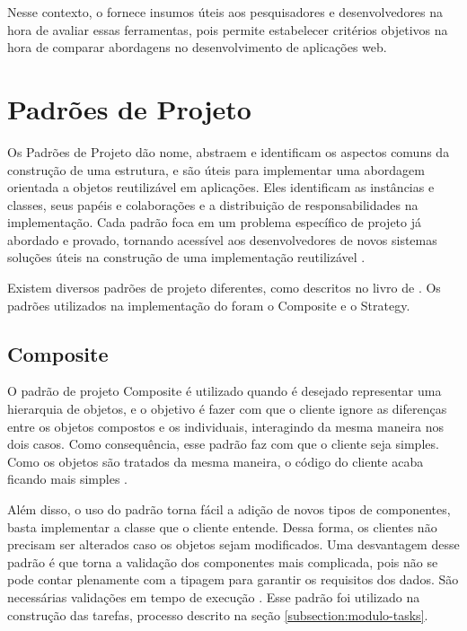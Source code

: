 \documentclass[12pt]{tcc}
\begin{document}
		Nesse contexto, o  fornece insumos úteis aos pesquisadores e desenvolvedores na hora de avaliar essas ferramentas, pois permite estabelecer critérios objetivos na hora de comparar abordagens no desenvolvimento de aplicações web.

		\section{Padrões de Projeto}
		\label{cap:padroes-de-projeto}

		Os Padrões de Projeto dão nome, abstraem e identificam os aspectos comuns da construção de uma estrutura, e são úteis para implementar uma abordagem orientada a objetos reutilizável em aplicações. Eles identificam as instâncias e classes, seus papéis e colaborações e a distribuição de responsabilidades na implementação. Cada padrão foca em um problema específico de projeto já abordado e provado, tornando acessível aos desenvolvedores de novos sistemas soluções úteis na construção de uma implementação reutilizável \citep{gamma1994design}.
		
		Existem diversos padrões de projeto diferentes, como descritos no livro de \cite{gamma1994design}. Os padrões utilizados na implementação do  foram o Composite e o Strategy.

		\subsection{Composite}
		\label{subsection:composite}

		O padrão de projeto Composite é utilizado quando é desejado representar uma hierarquia de objetos, e o objetivo é fazer com que o cliente ignore as diferenças entre os objetos compostos e os individuais, interagindo da mesma maneira nos dois casos. Como consequência, esse padrão faz com que o cliente seja simples. Como os objetos são tratados da mesma maneira, o código do cliente acaba ficando mais simples \citep[Capítulo 4]{gamma1994design}.
		
		Além disso, o uso do padrão torna fácil a adição de novos tipos de componentes, basta implementar a classe que o cliente entende. Dessa forma, os clientes não precisam ser alterados caso os objetos sejam modificados. Uma desvantagem desse padrão é que torna a validação dos componentes mais complicada, pois não se pode contar plenamente com a tipagem para garantir os requisitos dos dados. São necessárias validações em tempo de execução \citep[Capítulo 4]{gamma1994design}. Esse padrão foi utilizado na construção das tarefas, processo descrito na seção \ref{subsection:modulo-tasks}.
\end{document}
